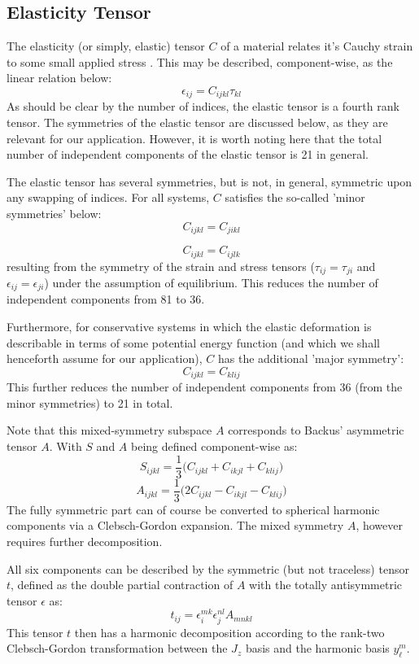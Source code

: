 \documentclass[10pt,a4paper]{article}
\begin{document}
\subsection{Elasticity Tensor}
 
 

The elasticity (or simply, elastic) tensor $C$ of a material relates it's Cauchy strain  to some small applied stress . This may be described, component-wise, as the linear relation below:
$$
\epsilon_{ij}=C_{ijkl}\tau_{kl}
$$
As should be clear by the number of indices, the elastic tensor is a fourth rank tensor. The symmetries of the elastic tensor are discussed below, as they are relevant for our application. However, it is worth noting here that the total number of independent components of the elastic tensor is 21 in general.

The elastic tensor has several symmetries, but is not, in general, symmetric upon any swapping of indices. For all systems, $C$ satisfies the so-called 'minor symmetries' below:
$$
C_{ijkl}=C_{jikl}
$$

$$
C_{ijkl}=C_{ijlk}
$$
resulting from the symmetry of the strain and stress tensors ($\tau_{ij}=\tau_{ji}$ and $\epsilon_{ij}=\epsilon_{ji}$) under the assumption of equilibrium. This reduces the number of independent components from 81 to 36.

Furthermore, for conservative systems in which the elastic deformation is describable in terms of some potential energy function (and which we shall henceforth assume for our application), $C$ has the additional 'major symmetry':
$$
C_{ijkl}=C_{klij}
$$
This further reduces the number of independent components from 36 (from the minor symmetries) to 21 in total.

Note that this mixed-symmetry subspace $A$ corresponds to Backus' \cite{backus1970geometrical} asymmetric tensor $A$. With $S$ and $A$ being defined component-wise as:
$$
S_{ijkl}=\frac{1}{3}\big( C_{ijkl} + C_{ikjl} + C_{klij} \big)
$$
$$
A_{ijkl} = \frac{1}{3}\big( 2C_{ijkl} -C_{ikjl} -C_{klij}  \big)
$$
The fully symmetric part can of course be converted to spherical harmonic components via a Clebsch-Gordon expansion. The mixed symmetry $A$, however requires further decomposition. 

All six components can be described by the symmetric (but not traceless) tensor $t$, defined as the double partial contraction of $A$ with the totally antisymmetric tensor $\epsilon$ as:
$$
t_{ij} = \epsilon_{i}^{mk}\epsilon_{j}^{nl}A_{mnkl}
$$
This tensor $t$ then has a harmonic decomposition according to the rank-two Clebsch-Gordon transformation between the $J_z$ basis and the harmonic basis $y_{\ell}^m$. 
\end{document}
